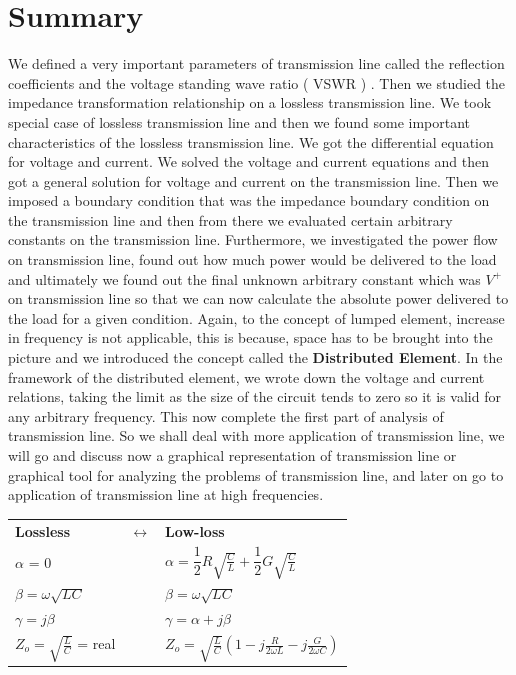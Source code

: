  \section{Summary}  
 We defined a very important parameters of transmission line called the reflection coefficients and the voltage standing wave ratio ( VSWR ) . Then we studied the impedance transformation relationship on a lossless transmission line. We took special case of lossless transmission line and then we found some important characteristics of the lossless transmission line. We got the differential equation for voltage and current. We solved the voltage and current equations and then got a general solution for voltage and current on the transmission line. Then we imposed a boundary condition that was the impedance boundary condition on the transmission line and then from there we evaluated certain arbitrary constants on the transmission line. Furthermore, we investigated the power flow on transmission line, found out how much power would be delivered to the load and ultimately we found out the final unknown arbitrary constant which was $V^+$ on transmission line so that we can now calculate the absolute power delivered to the load for a given condition. Again, to the concept of lumped element, increase in frequency is not applicable,  this is because, space has to be brought into the picture and we introduced the concept called the \textbf{Distributed Element}. In the framework of the distributed element, we wrote down the voltage and current relations, taking the limit as the size of the circuit tends to zero so it is valid for any arbitrary frequency. This now complete the first part of analysis of transmission line. So we shall deal with more application of transmission line, we will go and discuss now a graphical representation of transmission line or graphical tool for analyzing the problems of transmission line, and later on go to application of transmission line at high frequencies. 
 
 \begin{tabular}{l c l}
 {\bf Lossless}&   	$\leftrightarrow$  & {\bf Low-loss}  \\ 
 $\alpha$ = 0 &  & $\alpha = \dfrac{1}{2}R\sqrt{\frac{C}{L}} + \dfrac{1}{2}G\sqrt{\frac{C}{L}}$  \\
 $\beta = \omega\sqrt{LC}$ & & $\beta = \omega\sqrt{LC}$\\
 $\gamma = j\beta$ & & $\gamma = \alpha + j\beta$\\
 $Z_o = \sqrt{\frac{L}{C}}$ = real &  & 	$Z_o = \sqrt{\frac{L}{C}}\left(1 - j\frac{R}{2\omega L} - j\frac{G}{2\omega C}\right)$
 \end{tabular} 


